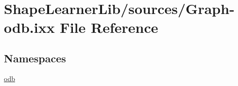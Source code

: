 \hypertarget{_graph-odb_8ixx}{}\section{Shape\+Learner\+Lib/sources/\+Graph-\/odb.ixx File Reference}
\label{_graph-odb_8ixx}
\subsection*{Namespaces}
\begin{DoxyCompactItemize}
\item 
 \hyperlink{namespaceodb}{odb}
\end{DoxyCompactItemize}

